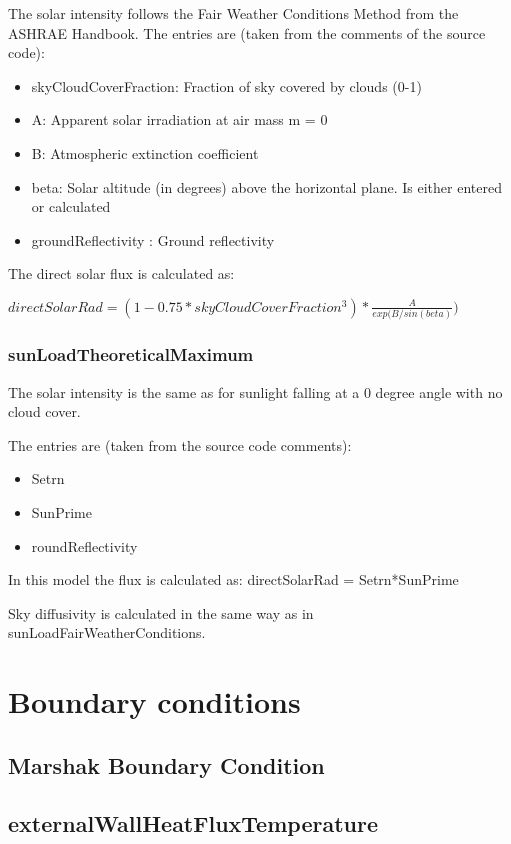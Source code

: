 The solar intensity follows the Fair Weather Conditions Method from the ASHRAE Handbook. The entries are (taken from the comments of the source code):

\begin{itemize}
    \item skyCloudCoverFraction: Fraction of sky covered by clouds (0-1)
    \item A: Apparent solar irradiation at air mass m = 0
    \item B: Atmospheric extinction coefficient
    \item beta: Solar altitude (in degrees) above the horizontal plane. Is either entered or calculated
    \item groundReflectivity : Ground reflectivity
\end{itemize}

The direct solar flux is calculated as:

$directSolarRad = (1 - 0.75*skyCloudCoverFraction^3)*\frac{A}{exp(B/sin(beta)})$

\subsubsection{sunLoadTheoreticalMaximum}

The solar intensity is the same as for sunlight falling at a 0 degree angle with no cloud cover.

The entries are (taken from the source code comments):
\begin{itemize}
    \item Setrn
    \item SunPrime
    \item roundReflectivity
\end{itemize}
In this model the flux is calculated as: directSolarRad = Setrn*SunPrime

Sky diffusivity is calculated in the same way as in sunLoadFairWeatherConditions.

\section{Boundary conditions}

\subsection{Marshak Boundary Condition}

\subsection{externalWallHeatFluxTemperature}

